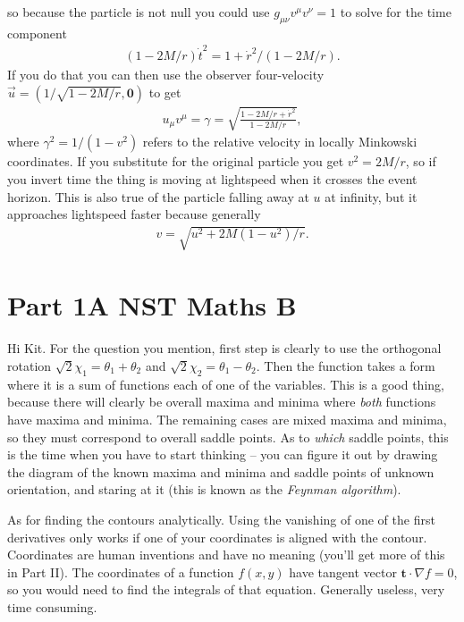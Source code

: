 \documentclass{article}
\begin{document}
\begin{enumerate}
	so because the particle is not null you could use $g_{\mu\nu}v^\mu v^\nu=1$ to solve for the time component 
	\begin{eqnarray}
		\left( 1-2M/r \right)\dot{t}^2=1+\dot{r}^2/\left( 1-2M/r \right).
	\end{eqnarray}
	If you do that you can then use the observer four-velocity $\overrightarrow{u}=\left( 1/\sqrt{1-2M/r},\mathbf{0} \right)$ to get
	\begin{eqnarray}
		u_\mu v^\mu=\gamma=\sqrt{\frac{1-2M/r+\dot{r}^2}{1-2M/r}},
	\end{eqnarray}
	where $\gamma^2=1/\left( 1-v^2 \right)$ refers to the relative velocity in locally Minkowski coordinates. If you substitute for the original particle you get $v^2=2M/r$, so if you invert time the thing is moving at lightspeed when it crosses the event horizon. This is also true of the particle falling away at $u$ at infinity, but it approaches lightspeed faster because generally
	\begin{eqnarray}
		v=\sqrt{u^2+2M\left( 1-u^2 \right)/r}.
	\end{eqnarray}
	\end{enumerate}
	\section{Part 1A NST Maths B}
	Hi Kit. For the question you mention, first step is clearly to use the orthogonal rotation $\sqrt{2}\chi_1=\theta_1+\theta_2$ and $\sqrt{2}\chi_2=\theta_1-\theta_2$. Then the function takes  a form where it is a sum of functions each of one of the variables. This is a good thing, because there will clearly be overall maxima and minima where \textit{both} functions have maxima and minima. The remaining cases are mixed maxima and minima, so they must correspond to overall saddle points. As to \textit{which} saddle points, this is the time when you have to start thinking -- you can figure it out by drawing the diagram of the known maxima and minima and saddle points of unknown orientation, and staring at it (this is known as the \textit{Feynman algorithm}).
	\par
	As for finding the contours analytically. Using the vanishing of one of the first derivatives only works if one of your coordinates is aligned with the contour. Coordinates are human inventions and have no meaning (you'll get more of this in Part II). The coordinates of a function $f(x,y)$ have tangent vector $\mathbf{t}\cdot\nabla f=0$, so you would need to find the integrals of that equation. Generally useless, very time consuming.
	
\end{document}

